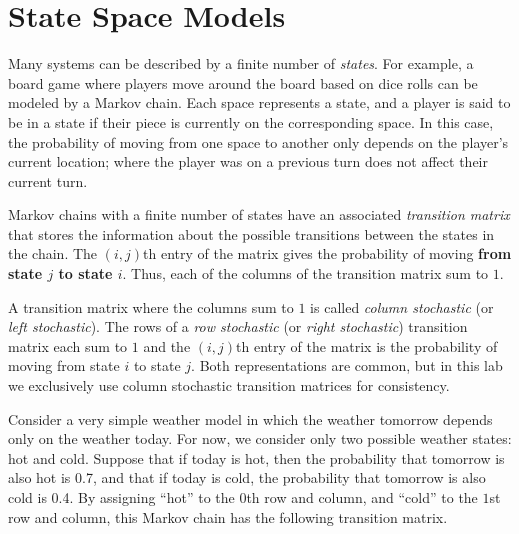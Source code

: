 \label{lab:Markov}
\labdependencies{}

\section*{State Space Models} %

Many systems can be described by a finite number of \emph{states}.
For example, a board game where players move around the board based on dice rolls can be modeled by a Markov chain.
Each space represents a state, and a player is said to be in a state if their piece is currently on the corresponding space.
In this case, the probability of moving from one space to another only depends on the player's current location; where the player was on a previous turn does not affect their current turn.

Markov chains with a finite number of states have an associated \emph{transition matrix} that stores the information about the possible transitions between the states in the chain.
The $(i,j)$th entry of the matrix gives the probability of moving \textbf{from state $j$ to state $i$}.
Thus, each of the columns of the transition matrix sum to $1$.

\begin{info} %
A transition matrix where the columns sum to $1$ is called \emph{column stochastic} (or \emph{left stochastic}).
The rows of a \emph{row stochastic} (or \emph{right stochastic}) transition matrix each sum to $1$ and the $(i,j)$th entry of the matrix is the probability of moving from state $i$ to state $j$.
Both representations are common, but in this lab we exclusively use column stochastic transition matrices for consistency.
\end{info}

Consider a very simple weather model in which the weather tomorrow depends only on the weather today.
For now, we consider only two possible weather states: hot and cold.
Suppose that if today is hot, then the probability that tomorrow is also hot is 0.7, and that if today is cold, the probability that tomorrow is also cold is 0.4.
By assigning ``hot'' to the $0$th row and column, and ``cold'' to the $1$st row and column, this Markov chain has the following transition matrix.

